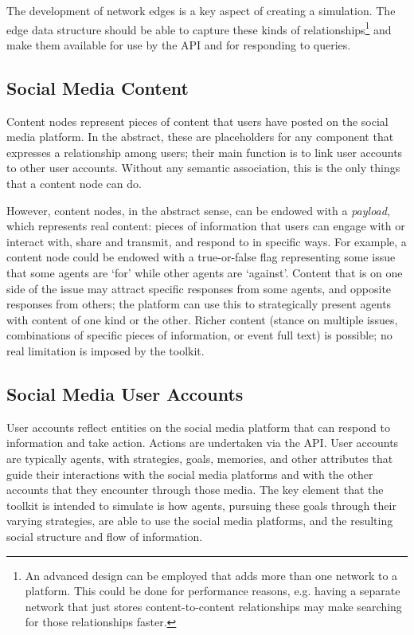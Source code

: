 The development of network edges is a key aspect of creating a \rhpc simulation. The edge data structure should be able to capture these kinds of relationships\footnote{An advanced design can be employed that adds more than one network to a platform. This could be done for performance reasons, e.g. having a separate network that just stores content-to-content relationships may make searching for those relationships faster.} and make them available for use by the API and for responding to queries. 

\subsection{Social Media Content}
Content nodes represent pieces of content that users have posted on the social media platform. In the abstract, these are placeholders for any component that expresses a relationship among users; their main function is to link user accounts to other user accounts. Without any semantic association, this is the only things that a content node can do.

However, content nodes, in the abstract sense, can be endowed with a \textit{payload}, which represents real content: pieces of information that users can engage with or interact with, share and transmit, and respond to in specific ways. For example, a content node could be endowed with a true-or-false flag representing some issue that some agents are `for' while other agents are `against'. Content that is on one side of the issue may attract specific responses from some agents, and opposite responses from others; the platform can use this to strategically present agents with content of one kind or the other. Richer content (stance on multiple issues, combinations of specific pieces of information, or event full text) is possible; no real limitation is imposed by the \rhpc toolkit.

\subsection{Social Media User Accounts}
User accounts reflect entities on the social media platform that can respond to information and take action. Actions are undertaken via the API. User accounts are typically agents, with strategies, goals, memories, and other attributes that guide their interactions with the social media platforms and with the other accounts that they encounter through those media. The key element that the \rhpc toolkit is intended to simulate is how agents, pursuing these goals through their varying strategies, are able to use the social media platforms, and the resulting social structure and flow of information.

